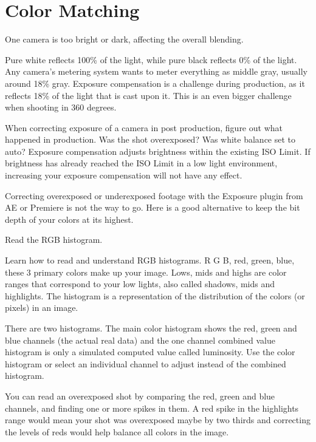 \chapter{Color Matching}
\pagecolor{white}
\label{chap:32}
\begin{fullwidth}


\problem

{\large One camera is too bright or dark, affecting the overall blending. \par}

Pure white reflects 100\% of the light, while pure black reflects 0\% of the light. Any camera’s metering system wants to meter everything as middle gray, usually around 18\% gray. Exposure compensation is a challenge during production, as it reflects 18\% of the light that is cast upon it. This is an even bigger challenge when shooting in 360 degrees. 

When correcting exposure of a camera in post production, figure out what happened in production. Was the shot overexposed? Was white balance set to auto? Exposure compensation adjusts brightness within the existing ISO Limit. If brightness has already reached the ISO Limit in a low light environment, increasing your exposure compensation will not have any effect.


Correcting overexposed or underexposed footage with the Exposure plugin from AE or Premiere is not the way to go. Here is a good alternative to keep the bit depth of your colors at its highest.

\clearpage
\solution

{\large Read the RGB histogram. \par}


Learn how to read and understand RGB histograms. R G B, red, green, blue, these 3 primary colors make up your image. Lows, mids and highs are color ranges that correspond to your low lights, also called shadows, mids and highlights. The histogram is a representation of the distribution of the colors (or pixels) in an image. 

There are two histograms. The main color histogram shows the red, green and blue channels (the actual real data) and the one channel combined value histogram is only a simulated computed value called luminosity. Use the color histogram or select an individual channel to adjust instead of the combined histogram.

You can read an overexposed shot by comparing the red, green and blue channels, and finding one or more spikes in them. A red spike in the highlights range would mean your shot was overexposed maybe by two thirds and correcting the levels of reds would help balance all colors in the image.


\end{fullwidth}
